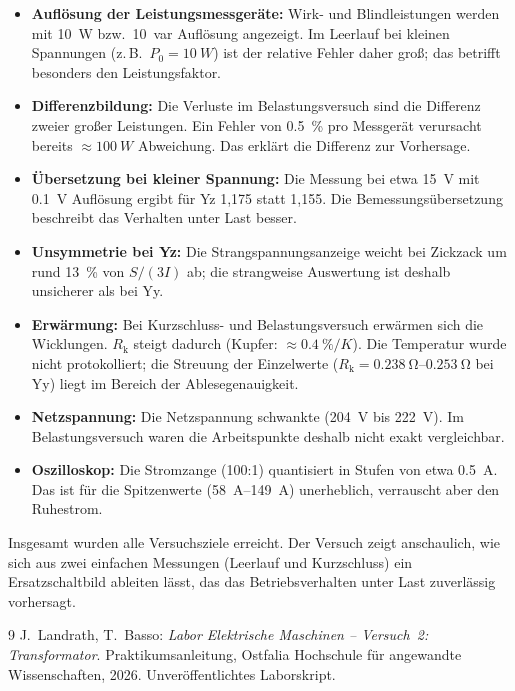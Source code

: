 \documentclass[a4paper,11pt]{scrreprt}
\begin{document}
\begin{itemize}
  \item \textbf{Auflösung der Leistungsmessgeräte:} Wirk- und Blindleistungen werden mit \SI{10}{W} bzw.\ \SI{10}{var} Auflösung angezeigt. Im Leerlauf bei kleinen Spannungen (z.\,B.\ $P_0=\SI{10}{W}$) ist der relative Fehler daher groß; das betrifft besonders den Leistungsfaktor.
  \item \textbf{Differenzbildung:} Die Verluste im Belastungsversuch sind die Differenz zweier großer Leistungen. Ein Fehler von \SI{0.5}{\percent} pro Messgerät verursacht bereits $\approx\SI{100}{W}$ Abweichung. Das erklärt die Differenz zur Vorhersage.
  \item \textbf{Übersetzung bei kleiner Spannung:} Die Messung bei etwa \SI{15}{V} mit \SI{0.1}{V} Auflösung ergibt für Yz 1,175 statt 1,155. Die Bemessungsübersetzung beschreibt das Verhalten unter Last besser.
  \item \textbf{Unsymmetrie bei Yz:} Die Strangspannungsanzeige weicht bei Zickzack um rund \SI{13}{\percent} von $S/(3I)$ ab; die strangweise Auswertung ist deshalb unsicherer als bei Yy.
  \item \textbf{Erwärmung:} Bei Kurzschluss- und Belastungsversuch erwärmen sich die Wicklungen. $R_\mathrm{k}$ steigt dadurch (Kupfer: $\approx\SI{0.4}{\percent/K}$). Die Temperatur wurde nicht protokolliert; die Streuung der Einzelwerte ($R_\mathrm{k}=\SIrange{0.238}{0.253}{\ohm}$ bei Yy) liegt im Bereich der Ablesegenauigkeit.
  \item \textbf{Netzspannung:} Die Netzspannung schwankte (\SI{204}{V} bis \SI{222}{V}). Im Belastungsversuch waren die Arbeitspunkte deshalb nicht exakt vergleichbar.
  \item \textbf{Oszilloskop:} Die Stromzange (100:1) quantisiert in Stufen von etwa \SI{0.5}{A}. Das ist für die Spitzenwerte (\SIrange{58}{149}{A}) unerheblich, verrauscht aber den Ruhestrom.
\end{itemize}

Insgesamt wurden alle Versuchsziele erreicht. Der Versuch zeigt anschaulich, wie sich aus zwei einfachen Messungen (Leerlauf und Kurzschluss) ein Ersatzschaltbild ableiten lässt, das das Betriebsverhalten unter Last zuverlässig vorhersagt.

\begin{thebibliography}{9}
 J.~Landrath, T.~Basso: \emph{Labor Elektrische Maschinen -- Versuch~2: Transformator}. Praktikumsanleitung, Ostfalia Hochschule für angewandte Wissenschaften, 2026. Unveröffentlichtes Laborskript.
\end{thebibliography}
\end{document}
